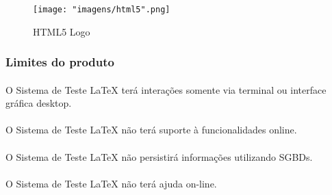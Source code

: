 \documentclass[12pt]{article}
\begin{document}
			\begin{figure}
				\caption{HTML5 Logo}
				\centering
				\texttt{[image: "imagens/html5".png]}
			\end{figure}
				
		\subsubsection{Limites do produto}
			\paragraph{}O Sistema de Teste LaTeX terá interações somente via terminal ou interface gráfica desktop.
			\paragraph{}O Sistema de Teste LaTeX não terá suporte à funcionalidades online.
			\paragraph{}O Sistema de Teste LaTeX não persistirá informações utilizando SGBDs.
			\paragraph{}O Sistema de Teste LaTeX não terá ajuda on-line.
\end{document}
